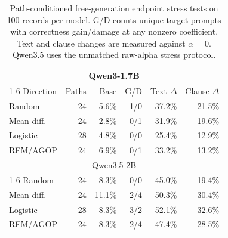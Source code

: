 \begin{table}[t]
\centering
\small
\setlength{\tabcolsep}{1.8pt}
\caption{Path-conditioned free-generation endpoint stress tests on 100 records
per model. G/D counts unique target prompts with correctness gain/damage at any
nonzero coefficient. Text and clause changes are measured against $\alpha=0$.
Qwen3.5 uses the unmatched raw-alpha stress protocol.}
\label{tab:endpoint-validation}
\begin{tabular*}{\columnwidth}{@{\extracolsep{\fill}}lrrrrr@{}}
\toprule
\multicolumn{6}{c}{Qwen3-1.7B} \\
\cmidrule(lr){1-6}
Direction & Paths & Base & G/D & Text $\Delta$ & Clause $\Delta$ \\
\midrule
Random & 24 & 5.6\% & 1/0 & 37.2\% & 21.5\% \\
Mean diff. & 24 & 2.8\% & 0/1 & 31.9\% & 19.6\% \\
Logistic & 28 & 4.8\% & 0/0 & 25.4\% & 12.9\% \\
RFM/AGOP & 24 & 6.9\% & 0/1 & 33.2\% & 13.2\% \\
\midrule
\multicolumn{6}{c}{Qwen3.5-2B} \\
\cmidrule(lr){1-6}
Random & 24 & 8.3\% & 0/0 & 45.0\% & 19.4\% \\
Mean diff. & 24 & 11.1\% & 2/4 & 50.3\% & 30.4\% \\
Logistic & 28 & 8.3\% & 3/2 & 52.1\% & 32.6\% \\
RFM/AGOP & 24 & 8.3\% & 2/4 & 47.4\% & 28.5\% \\
\bottomrule
\end{tabular*}

\end{table}
